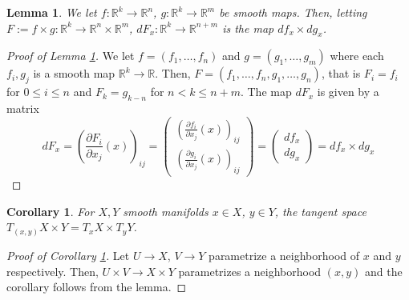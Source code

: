 \documentclass[english]{article}
\newcommand{\pydx}[2]{\frac{\partial #1}{\partial #2}}
\newcommand{\RR}{\mathbb{R}}
\newenvironment{subproof}[1][\proofname]{%
	\renewcommand{\qedsymbol}{$\blacksquare$}%
	\begin{proof}[#1]%
	}{%
	\end{proof}%
}
\newtheorem{corollary}[theorem]{Corollary}
\newtheorem{lemma}[theorem]{Lemma}
\theoremstyle{remark}
\theoremstyle{definition}
\begin{document}
\begin{lemma}\label{2alem}
	We let $f:\RR^k\to \RR^n$, $g:\RR^k\to \RR^m$ be smooth maps. Then, letting $F:=f\times g:\RR^k\to \RR^{n}\times \RR^m$, $dF_x:\RR^k\to \RR^{n+m}$ is the map $df_x\times dg_x$. 
\end{lemma}\begin{subproof}[Proof of Lemma \ref{2alem}]
We let $f=(f_1,\ldots,f_n)$ and $g=(g_1,\dots,g_m)$ where each $f_i,g_j$ is a smooth map $\RR^k\to \RR$. Then, $F=(f_1,\ldots,f_n,g_1,\dots,g_n)$, that is $F_i=f_i$ for $0\leq i\leq n$ and $F_k=g_{k-n}$ for $n<k\leq n+m$. The map $dF_x$ is given by a matrix \begin{equation*}dF_x=
\left(\pydx{F_i}{x_j}(x)\right)_{ij}=\begin{pmatrix}
\left(\pydx{f_i}{x_j}(x)\right)_{ij}\\\hline
\left(\pydx{g_i}{x_j}(x)\right)_{ij}
\end{pmatrix}=\begin{pmatrix}df_x
\\\hline
dg_x
\end{pmatrix}=df_x\times dg_x
\end{equation*}
\end{subproof}
\begin{corollary}\label{Cor:tsprod}
	For $X,Y$ smooth manifolds $x\in X$, $y\in Y$, the tangent space $T_{(x,y)}X\times Y=T_xX\times T_yY$.
\end{corollary}
\begin{subproof}[Proof of Corollary \ref{Cor:tsprod}]
Let $U\to X$, $V\to Y$ parametrize a neighborhood of $x$ and $y$ respectively. Then, $U\times V\to X\times Y$ parametrizes a neighborhood $(x,y)$ and the corollary follows from the lemma. 
\end{subproof}
\end{document}

